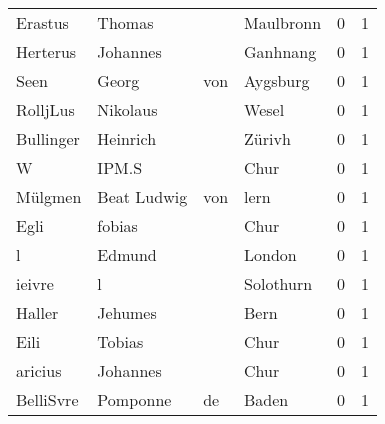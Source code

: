\begin{center}
\begin{tiny}
\begin{longtabu}{llllrr}
                  Erastus &                             Thomas &             &                                   Maulbronn &          0 &         1 \\
                 Herterus &                           Johannes &             &                                    Ganhnang &          0 &         1 \\
                     Seen &                              Georg &         von &                                    Aygsburg &          0 &         1 \\
                 RolljLus &                           Nikolaus &             &                                       Wesel &          0 &         1 \\
                Bullinger &                           Heinrich &             &                                      Zürivh &          0 &         1 \\
                        W &                              IPM.S &             &                                        Chur &          0 &         1 \\
                  Mülgmen &                        Beat Ludwig &         von &                                        lern &          0 &         1 \\
                     Egli &                             fobias &             &                                        Chur &          0 &         1 \\
                        l &                             Edmund &             &                                      London &          0 &         1 \\
                   ieivre &                                  l &             &                                   Solothurn &          0 &         1 \\
                   Haller &                            Jehumes &             &                                        Bern &          0 &         1 \\
                     Eili &                             Tobias &             &                                        Chur &          0 &         1 \\
                  aricius &                           Johannes &             &                                        Chur &          0 &         1 \\
                BelliSvre &                           Pomponne &          de &                                       Baden &          0 &         1 \\

\end{longtabu}
\end{tiny}
\end{center}
